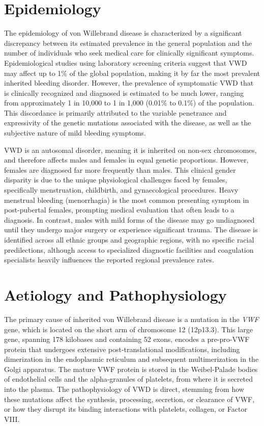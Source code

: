 \section*{Epidemiology}
The epidemiology of von Willebrand disease is characterized by a significant discrepancy between its estimated prevalence in the general population and the number of individuals who seek medical care for clinically significant symptoms. Epidemiological studies using laboratory screening criteria suggest that VWD may affect up to 1\% of the global population, making it by far the most prevalent inherited bleeding disorder. However, the prevalence of symptomatic VWD that is clinically recognized and diagnosed is estimated to be much lower, ranging from approximately 1 in 10,000 to 1 in 1,000 (0.01\% to 0.1\%) of the population. This discordance is primarily attributed to the variable penetrance and expressivity of the genetic mutations associated with the disease, as well as the subjective nature of mild bleeding symptoms.

VWD is an autosomal disorder, meaning it is inherited on non-sex chromosomes, and therefore affects males and females in equal genetic proportions. However, females are diagnosed far more frequently than males. This clinical gender disparity is due to the unique physiological challenges faced by females, specifically menstruation, childbirth, and gynaecological procedures. Heavy menstrual bleeding (menorrhagia) is the most common presenting symptom in post-pubertal females, prompting medical evaluation that often leads to a diagnosis. In contrast, males with mild forms of the disease may go undiagnosed until they undergo major surgery or experience significant trauma. The disease is identified across all ethnic groups and geographic regions, with no specific racial predilections, although access to specialized diagnostic facilities and coagulation specialists heavily influences the reported regional prevalence rates.

\section*{Aetiology and Pathophysiology}
The primary cause of inherited von Willebrand disease is a mutation in the \textit{VWF} gene, which is located on the short arm of chromosome 12 (12p13.3). This large gene, spanning 178 kilobases and containing 52 exons, encodes a pre-pro-VWF protein that undergoes extensive post-translational modifications, including dimerization in the endoplasmic reticulum and subsequent multimerization in the Golgi apparatus. The mature VWF protein is stored in the Weibel-Palade bodies of endothelial cells and the alpha-granules of platelets, from where it is secreted into the plasma. The pathophysiology of VWD is direct, stemming from how these mutations affect the synthesis, processing, secretion, or clearance of VWF, or how they disrupt its binding interactions with platelets, collagen, or Factor VIII.

